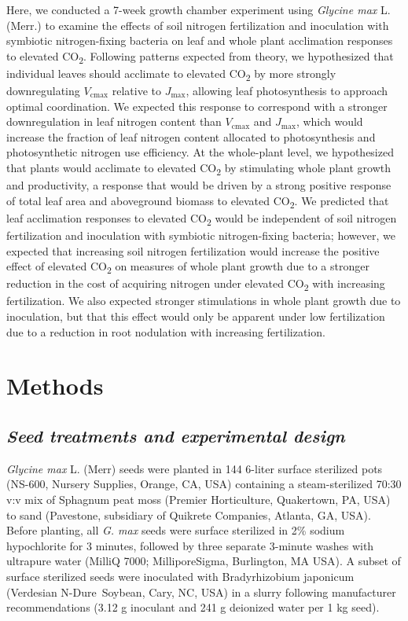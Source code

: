 Here, we conducted a 7-week growth chamber experiment using \textit{Glycine max} L. (Merr.) to examine the effects of soil nitrogen fertilization and inoculation with symbiotic nitrogen-fixing bacteria on leaf and whole plant acclimation responses to elevated CO\textsubscript{2}. Following patterns expected from theory, we hypothesized that individual leaves should acclimate to elevated CO\textsubscript{2} by more strongly downregulating $V_\mathrm{cmax}$ relative to $J_\mathrm{max}$, allowing leaf photosynthesis to approach optimal coordination. We expected this response to correspond with a stronger downregulation in leaf nitrogen content than $V_\mathrm{cmax}$ and $J_\mathrm{max}$, which would increase the fraction of leaf nitrogen content allocated to photosynthesis and photosynthetic nitrogen use efficiency. At the whole-plant level, we hypothesized that plants would acclimate to elevated CO\textsubscript{2} by stimulating whole plant growth and productivity, a response that would be driven by a strong positive response of total leaf area and aboveground biomass to elevated CO\textsubscript{2}. We predicted that leaf acclimation responses to elevated CO\textsubscript{2} would be independent of soil nitrogen fertilization and inoculation with symbiotic nitrogen-fixing bacteria; however, we expected that increasing soil nitrogen fertilization would increase the positive effect of elevated CO\textsubscript{2} on measures of whole plant growth due to a stronger reduction in the cost of acquiring nitrogen under elevated CO\textsubscript{2} with increasing fertilization. We also expected stronger stimulations in whole plant growth due to inoculation, but that this effect would only be apparent under low fertilization due to a reduction in root nodulation with increasing fertilization.

\section{Methods}
\subsection{\textit{Seed treatments and experimental design}}
\textit{Glycine max} L. (Merr) seeds were planted in 144 6-liter surface sterilized pots (NS-600, Nursery Supplies, Orange, CA, USA) containing a steam-sterilized 70:30 v:v mix of Sphagnum peat moss (Premier Horticulture, Quakertown, PA, USA) to sand (Pavestone, subsidiary of Quikrete Companies, Atlanta, GA, USA). Before planting, all \textit{G. max} seeds were surface sterilized in 2\% sodium hypochlorite for 3 minutes, followed by three separate 3-minute washes with ultrapure water (MilliQ 7000; MilliporeSigma, Burlington, MA USA). A subset of surface sterilized seeds were inoculated with Bradyrhizobium japonicum (Verdesian N-Dure\texttrademark\ Soybean, Cary, NC, USA) in a slurry following manufacturer recommendations (3.12 g inoculant and 241 g deionized water per 1 kg seed).
    
